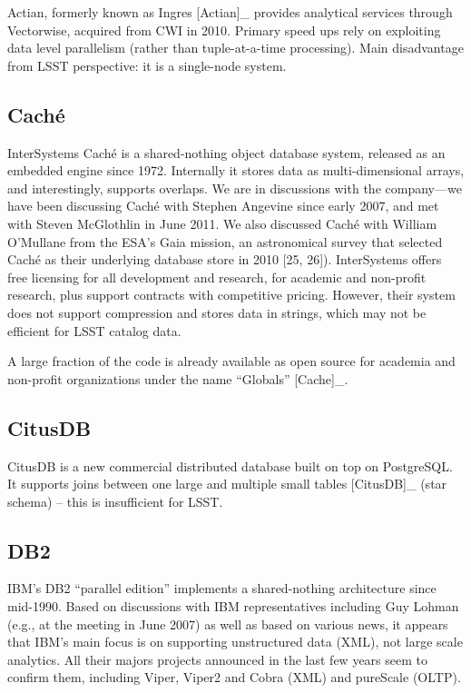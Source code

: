\documentclass[DM,lsstdraft,toc]{lsstdoc}
\begin{document}
Actian, formerly known as Ingres {[}Actian{]}\_ provides analytical
services through Vectorwise, acquired from CWI in 2010. Primary speed
ups rely on exploiting data level parallelism (rather than
tuple-at-a-time processing). Main disadvantage from LSST perspective: it
is a single-node system.

\subsection{Caché}\label{cachuxe9}

InterSystems Caché is a shared-nothing object database system, released
as an embedded engine since 1972. Internally it stores data as
multi-dimensional arrays, and interestingly, supports overlaps. We are
in discussions with the company---we have been discussing Caché with
Stephen Angevine since early 2007, and met with Steven McGlothlin in
June 2011. We also discussed Caché with William O'Mullane from the ESA's
Gaia mission, an astronomical survey that selected Caché as their
underlying database store in 2010 {[}25, 26{]}). InterSystems offers
free licensing for all development and research, for academic and
non-profit research, plus support contracts with competitive pricing.
However, their system does not support compression and stores data in
strings, which may not be efficient for LSST catalog data.

A large fraction of the code is already available as open source for
academia and non-profit organizations under the name ``Globals''
{[}Cache{]}\_.

\subsection{CitusDB}\label{citusdb}

CitusDB is a new commercial distributed database built on top on
PostgreSQL. It supports joins between one large and multiple small
tables {[}CitusDB{]}\_ (star schema) -- this is insufficient for LSST.

\subsection{DB2}\label{db2}

IBM's DB2 ``parallel edition'' implements a shared-nothing architecture
since mid-1990. Based on discussions with IBM representatives including
Guy Lohman (e.g., at the meeting in June 2007) as well as based on
various news, it appears that IBM's main focus is on supporting
unstructured data (XML), not large scale analytics. All their majors
projects announced in the last few years seem to confirm them, including
Viper, Viper2 and Cobra (XML) and pureScale (OLTP).
\end{document}
